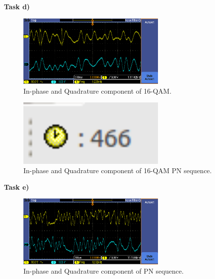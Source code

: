 \documentclass{article}
\begin{document}
\pagebreak
\textbf{Task d)}

\begin{figure}[h]
  \begin{center}
    \includegraphics[width=0.65\textwidth]{img/task_d_oscilloscope.png}
    \caption{In-phase and Quadrature component of 16-QAM.}
  \end{center}
\end{figure}

\begin{figure}[h]
  \begin{center}
    \includegraphics[width=0.65\textwidth]{img/task_d_profile.png}
    \caption{In-phase and Quadrature component of 16-QAM PN sequence.}
  \end{center}
\end{figure}

\pagebreak

\pagebreak
\textbf{Task e)}

\begin{figure}[h]
  \begin{center}
    \includegraphics[width=0.65\textwidth]{img/task_e_oscilloscope.png}
    \caption{In-phase and Quadrature component of PN sequence.}
  \end{center}
\end{figure}
\end{document}
